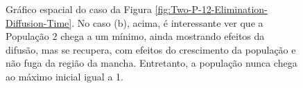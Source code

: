 \documentclass{article}
\begin{document}
	\begin{figure}[h]
		\centering
		\qquad
		\caption{Gráfico espacial do caso da Figura \ref{fig:Two-P-12-Elimination-Diffusion-Time}. No caso (b), acima, é interessante ver que a População 2 chega a um mínimo, ainda mostrando efeitos da difusão, mas se recupera, com efeitos do crescimento da população e não fuga da região da mancha. Entretanto, a população nunca chega ao máximo inicial igual a 1.}
		\label{fig:Two-P-14-Elimination-Diffusion-Space}
	\end{figure}	
	
\end{document}

